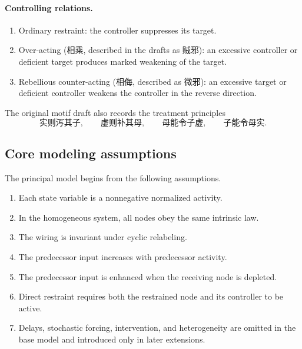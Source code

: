 \documentclass[11pt, reqno]{amsart}
\theoremstyle{definition}
\theoremstyle{remark}
\begin{document}
\paragraph{Controlling relations.}
\begin{enumerate}[label=\arabic*.,leftmargin=2.5em,start=6]
    \item Ordinary restraint: the controller suppresses its target.
    \item Over-acting (相乘, described in the drafts as 贼邪): an excessive
    controller or deficient target produces marked weakening of the target.
    \item Rebellious counter-acting (相侮, described as 微邪): an excessive
    target or deficient controller weakens the controller in the reverse
    direction.
\end{enumerate}

The original motif draft also records the treatment principles
\[
    \text{实则泻其子},
    \qquad
    \text{虚则补其母},
    \qquad
    \text{母能令子虚},
    \qquad
    \text{子能令母实}.
\]


\subsection{Core modeling assumptions}

The principal model begins from the following assumptions.

\begin{enumerate}[label=(A\arabic*),leftmargin=3em]
    \item Each state variable is a nonnegative normalized activity.
    \item In the homogeneous system, all nodes obey the same intrinsic law.
    \item The wiring is invariant under cyclic relabeling.
    \item The predecessor input increases with predecessor activity.
    \item The predecessor input is enhanced when the receiving node is
    depleted.
    \item Direct restraint requires both the restrained node and its controller
    to be active.
    \item Delays, stochastic forcing, intervention, and heterogeneity are
    omitted in the base model and introduced only in later extensions.
\end{enumerate}
\end{document}
